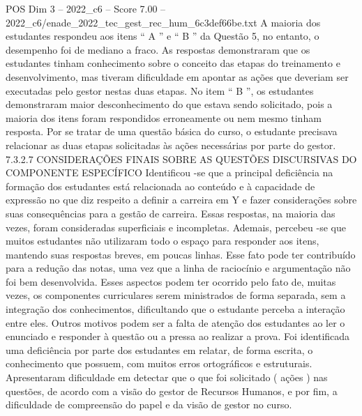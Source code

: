 \begin{textsample}{POS Dim 3 – 2022\_c6 – Score 7.00 – 2022\_c6/enade\_2022\_tec\_gest\_rec\_hum\_6c3def66be.txt}
A maioria dos estudantes respondeu aos itens “ A ” e “ B ” da Questão 5, no entanto, o desempenho foi de mediano a fraco.
As respostas demonstraram que os estudantes tinham conhecimento sobre o conceito das etapas do treinamento e desenvolvimento, mas tiveram dificuldade em apontar as ações que deveriam ser executadas pelo gestor nestas duas etapas.
No item “ B ”, os estudantes demonstraram maior desconhecimento do que estava sendo solicitado, pois a maioria dos itens foram respondidos erroneamente ou nem mesmo tinham resposta.
Por se tratar de uma questão básica do curso, o estudante precisava relacionar as duas etapas solicitadas às ações necessárias por parte do gestor. 7.3.2.7 CONSIDERAÇÕES FINAIS SOBRE AS QUESTÕES DISCURSIVAS DO COMPONENTE ESPECÍFICO Identificou -se que a principal deficiência na formação dos estudantes está relacionada ao conteúdo e à capacidade de expressão no que diz respeito a definir a carreira em Y e fazer considerações sobre suas consequências para a gestão de carreira.
Essas respostas, na maioria das vezes, foram consideradas superficiais e incompletas.
Ademais, percebeu -se que muitos estudantes não utilizaram todo o espaço para responder aos itens, mantendo suas respostas breves, em poucas linhas.
Esse fato pode ter contribuído para a redução das notas, uma vez que a linha de raciocínio e argumentação não foi bem desenvolvida.
Esses aspectos podem ter ocorrido pelo fato de, muitas vezes, os componentes curriculares serem ministrados de forma separada, sem a integração dos conhecimentos, dificultando que o estudante perceba a interação entre eles.
Outros motivos podem ser a falta de atenção dos estudantes ao ler o enunciado e responder à questão ou a pressa ao realizar a prova.
Foi identificada uma deficiência por parte dos estudantes em relatar, de forma escrita, o conhecimento que possuem, com muitos erros ortográficos e estruturais.
Apresentaram dificuldade em detectar que o que foi solicitado ( ações ) nas questões, de acordo com a visão do gestor de Recursos Humanos, e por fim, a dificuldade de compreensão do papel e da visão de gestor no curso.

\end{textsample}
